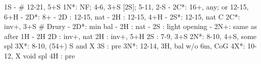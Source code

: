 1S -  # 12-21, 5+S
1N*: NF; 4-6, 3+S [2S]; 5-11, 2-S
   - 2C*: 16+, any; or 12-15, 6+H
        - 2D*: 8+
   - 2D : 12-15, nat
   - 2H : 12-15, 4+H
   - 2S*: 12-15, nat C
2C*: inv+, 3+S  # Drury
   - 2D*: min bal
   - 2H : nat
   - 2S : light opening
   - 2N+: same as after 1H - 2H
2D : inv+, nat
2H : inv+, 5+H
2S : 7-9, 3+S
2N*: 8-10, 4+S, some spl
3X*: 8-10, (54+) S and X
3S : pre
3N*: 12-14, 3H, bal w/o 6m, CoG
4X*: 10-12, X void spl
4H : pre